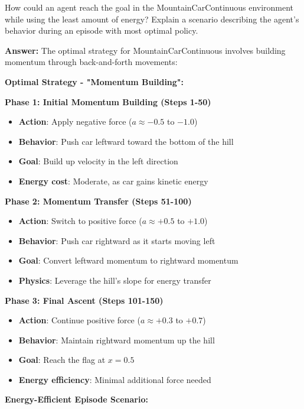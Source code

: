 \documentclass[12pt]{article}
\begin{document}
{{{How could an agent reach the goal in the MountainCarContinuous environment while using the least amount of energy? Explain a scenario describing the agent's behavior during an episode with most optimal policy.
\vspace*{0.3cm}

\textbf{Answer:} The optimal strategy for MountainCarContinuous involves building momentum through back-and-forth movements:

\textbf{Optimal Strategy - "Momentum Building":}

\textbf{Phase 1: Initial Momentum Building (Steps 1-50)}
\begin{itemize}
    \item \textbf{Action}: Apply negative force ($a \approx -0.5$ to $-1.0$)
    \item \textbf{Behavior}: Push car leftward toward the bottom of the hill
    \item \textbf{Goal}: Build up velocity in the left direction
    \item \textbf{Energy cost}: Moderate, as car gains kinetic energy
\end{itemize}

\textbf{Phase 2: Momentum Transfer (Steps 51-100)}
\begin{itemize}
    \item \textbf{Action}: Switch to positive force ($a \approx +0.5$ to $+1.0$)
    \item \textbf{Behavior}: Push car rightward as it starts moving left
    \item \textbf{Goal}: Convert leftward momentum to rightward momentum
    \item \textbf{Physics}: Leverage the hill's slope for energy transfer
\end{itemize}

\textbf{Phase 3: Final Ascent (Steps 101-150)}
\begin{itemize}
    \item \textbf{Action}: Continue positive force ($a \approx +0.3$ to $+0.7$)
    \item \textbf{Behavior}: Maintain rightward momentum up the hill
    \item \textbf{Goal}: Reach the flag at $x = 0.5$
    \item \textbf{Energy efficiency}: Minimal additional force needed
\end{itemize}

\textbf{Energy-Efficient Episode Scenario:}

}}}
\end{document}
